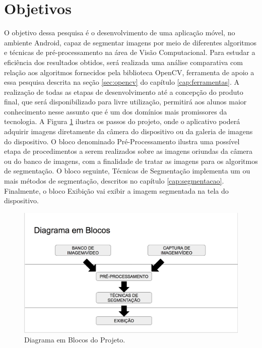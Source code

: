 \section{Objetivos}
O objetivo dessa pesquisa é o desenvolvimento de uma aplicação móvel, no ambiente Android, capaz de segmentar imagens por meio de diferentes algoritmos e técnicas de pré-processamento na área de Visão Computacional. Para estudar a eficiência dos resultados obtidos, será realizada uma análise comparativa com relação aos algoritmos fornecidos pela biblioteca OpenCV, ferramenta de apoio a essa pesquisa descrita na seção \ref{sec:opencv} do capítulo \ref{cap:ferramentas}. A realização de todas as etapas de desenvolvimento até a concepção do produto final, que será disponibilizado para livre utilização, permitirá aos alunos maior conhecimento nesse assunto que é um dos domínios mais promissores da tecnologia. A Figura \ref{fig:diag_blocos} ilustra os passos do projeto, onde o aplicativo poderá adquirir imagens diretamente da câmera do dispositivo ou da galeria de imagens do dispositivo. O bloco denominado Pré-Processamento ilustra uma possível etapa de procedimentos a serem realizados sobre as imagens oriundas da câmera ou do banco de imagens, com a finalidade de tratar as imagens para os algoritmos de segmentação. O bloco seguinte, Técnicas de Segmentação implementa um ou mais métodos de segmentação, descritos no capítulo \ref{cap:segmentacao}. Finalmente, o bloco Exibição vai exibir a imagem segmentada na tela do dispositivo. 

  \begin{figure}[!htb]
       \begin{center}  
          \includegraphics[width=0.7\columnwidth]{img/diag_blocos.png}
           \caption{\label{fig:diag_blocos}Diagrama em Blocos do Projeto.}
       \end{center}
   \end{figure}


